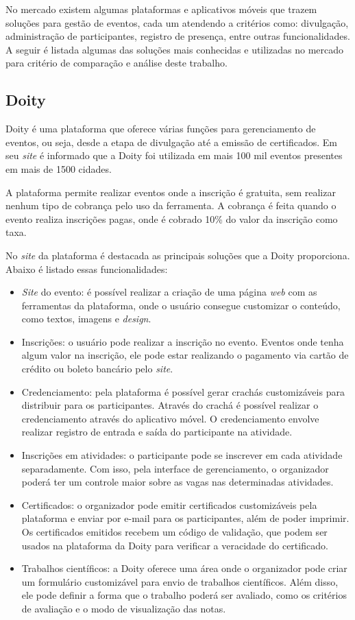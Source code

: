 No mercado existem algumas plataformas e aplicativos móveis que trazem soluções para gestão de eventos, cada um atendendo a critérios como: divulgação, administração de participantes, registro de presença, entre outras funcionalidades. A seguir é listada algumas das soluções mais conhecidas e utilizadas no mercado para critério de comparação e análise deste trabalho.

\subsection{Doity}

Doity é uma plataforma que oferece várias funções para gerenciamento de eventos, ou seja, desde a etapa de divulgação até a emissão de certificados. Em seu \textit{site} é informado que a Doity foi utilizada em mais 100 mil eventos presentes em mais de 1500 cidades. 

A plataforma permite realizar eventos onde a inscrição é gratuita, sem realizar nenhum tipo de cobrança pelo uso da ferramenta. A cobrança é feita quando o evento realiza inscrições pagas, onde é cobrado 10\% do valor da inscrição como taxa.

No \textit{site} da plataforma é destacada as principais soluções que a Doity proporciona. Abaixo é listado essas funcionalidades:

\begin{itemize}
    \item \textit{Site} do evento: é possível realizar a criação de uma página \textit{web} com as ferramentas da plataforma, onde o usuário consegue customizar o conteúdo, como textos, imagens e \textit{design}.
    \item Inscrições: o usuário pode realizar a inscrição no evento. Eventos onde tenha algum valor na inscrição, ele pode estar realizando o pagamento via cartão de crédito ou boleto bancário pelo \textit{site}.
    \item Credenciamento: pela plataforma é possível gerar crachás customizáveis para distribuir para os participantes. Através do crachá é possível realizar o credenciamento através do aplicativo móvel. O credenciamento envolve realizar registro de entrada e saída do participante na atividade.
    \item Inscrições em atividades: o participante pode se inscrever em cada atividade separadamente. Com isso, pela interface de gerenciamento, o organizador poderá ter um controle maior sobre as vagas nas determinadas atividades.
    \item Certificados: o organizador pode emitir certificados customizáveis pela plataforma e enviar por e-mail para os participantes, além de poder imprimir. Os certificados emitidos recebem um código de validação, que podem ser usados na plataforma da Doity para verificar a veracidade do certificado.
    \item Trabalhos científicos: a Doity oferece uma área onde o organizador pode criar um formulário customizável para envio de trabalhos científicos. Além disso, ele pode definir a forma que o trabalho poderá ser avaliado, como os critérios de avaliação e o modo de visualização das notas.
\end{itemize}

